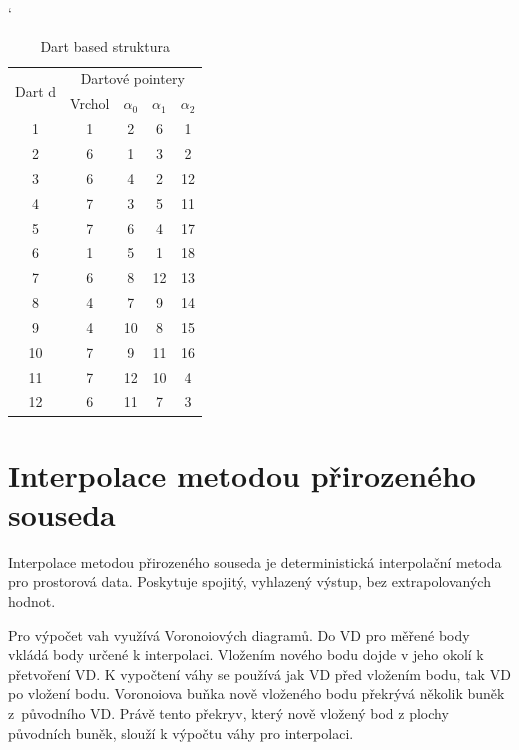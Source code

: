 \documentclass[12pt,a4paper]{article}
\begin{document}
\begin{table}[h!]
\catcode`
\begin{tabular}{|c||c|c|c|c|}
\hline
\multirow{2}{*}{Dart d} & \multicolumn{4}{c|}{Dartové pointery} \\ \cline{2-5} 
                         & Vrchol &$\alpha_0$ & $\alpha_1$ & $\alpha_2$      \\ \hline
1                        & 1          & 2      & 6      & 1      \\ \hline
2                        & 6          & 1      & 3      & 2      \\ \hline
3                        & 6          & 4      & 2      & 12     \\ \hline
4                        & 7          & 3      & 5      & 11     \\ \hline
5                        & 7          & 6      & 4      & 17     \\ \hline
6                        & 1          & 5      & 1      & 18     \\ \hline
7                        & 6          & 8      & 12     & 13     \\ \hline
8                        & 4          & 7      & 9      & 14     \\ \hline
9                        & 4          & 10     & 8      & 15     \\ \hline
10                       & 7          & 9      & 11     & 16     \\ \hline
11                       & 7          & 12     & 10     & 4      \\ \hline
12                       & 6          & 11     & 7      & 3      \\ \hline
\end{tabular}
\caption{Dart based struktura}
\label{tab:dart_based}
\end{table}

\clearpage
\section{Interpolace metodou přirozeného souseda}

Interpolace metodou přirozeného souseda je deterministická
interpolační metoda pro prostorová data. Poskytuje spojitý, vyhlazený
výstup, bez extrapolovaných hodnot.

Pro výpočet vah využívá Voronoiových diagramů. Do VD pro měřené body
vkládá body určené k interpolaci. Vložením nového bodu dojde v jeho
okolí k přetvoření VD. K vypočtení váhy se používá jak VD před
vložením bodu, tak VD po vložení bodu. Voronoiova buňka nově vloženého
bodu překrývá několik buněk z~původního VD. Právě tento překryv, který
nově vložený bod  z plochy původních buněk, slouží k
výpočtu váhy pro interpolaci.
\end{document}
